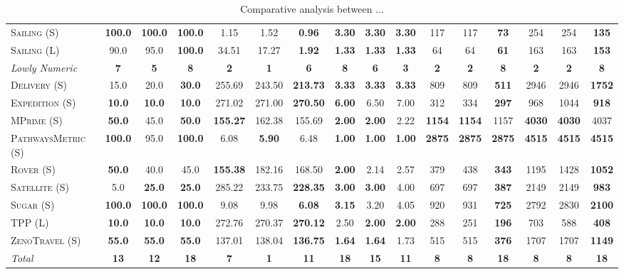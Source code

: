 \documentclass[11pt,landscape]{article}
\begin{document}
\begin{table*}[tb]
{\begin{tabular}{|l||ccc||ccc||ccc||ccc||ccc||}
\textsc{Sailing} (S)&\textbf{100.0}&\textbf{100.0}&\textbf{100.0}&1.15&1.52&\textbf{0.96}&\textbf{3.30}&\textbf{3.30}&\textbf{3.30}&117&117&\textbf{73}&254&254&\textbf{135}\\
\textsc{Sailing} (L)&90.0&95.0&\textbf{100.0}&34.51&17.27&\textbf{1.92}&\textbf{1.33}&\textbf{1.33}&\textbf{1.33}&64&64&\textbf{61}&163&163&\textbf{153}
\\\hline
\textit{Lowly Numeric}&\textbf{7}&\textbf{5}&\textbf{8}&\textbf{2}&\textbf{1}&\textbf{6}&\textbf{8}&\textbf{6}&\textbf{3}&\textbf{2}&\textbf{2}&\textbf{8}&\textbf{2}&\textbf{2}&\textbf{8}\\\hline
\textsc{Delivery} (S)&15.0&20.0&\textbf{30.0}&255.69&243.50&\textbf{213.73}&\textbf{3.33}&\textbf{3.33}&\textbf{3.33}&809&809&\textbf{511}&2946&2946&\textbf{1752}\\
\textsc{Expedition} (S)&\textbf{10.0}&\textbf{10.0}&\textbf{10.0}&271.02&271.00&\textbf{270.50}&\textbf{6.00}&6.50&7.00&312&334&\textbf{297}&968&1044&\textbf{918}\\
\textsc{MPrime} (S)&\textbf{50.0}&45.0&\textbf{50.0}&\textbf{155.27}&162.38&155.69&\textbf{2.00}&\textbf{2.00}&2.22&\textbf{1154}&\textbf{1154}&1157&\textbf{4030}&\textbf{4030}&4037\\
\textsc{PathwaysMetric} (S)&\textbf{100.0}&95.0&\textbf{100.0}&6.08&\textbf{5.90}&6.48&\textbf{1.00}&\textbf{1.00}&\textbf{1.00}&\textbf{2875}&\textbf{2875}&\textbf{2875}&\textbf{4515}&\textbf{4515}&\textbf{4515}\\
\textsc{Rover} (S)&\textbf{50.0}&40.0&45.0&\textbf{155.38}&182.16&168.50&\textbf{2.00}&2.14&2.57&379&438&\textbf{343}&1195&1428&\textbf{1052}\\
\textsc{Satellite} (S)&5.0&\textbf{25.0}&\textbf{25.0}&285.22&233.75&\textbf{228.35}&\textbf{3.00}&\textbf{3.00}&4.00&697&697&\textbf{387}&2149&2149&\textbf{983}\\
\textsc{Sugar} (S)&\textbf{100.0}&\textbf{100.0}&\textbf{100.0}&9.08&9.98&\textbf{6.08}&\textbf{3.15}&3.20&4.05&920&931&\textbf{725}&2792&2830&\textbf{2100}\\
\textsc{TPP} (L)&\textbf{10.0}&\textbf{10.0}&\textbf{10.0}&272.76&270.37&\textbf{270.12}&2.50&\textbf{2.00}&\textbf{2.00}&288&251&\textbf{196}&703&588&\textbf{408}\\
\textsc{ZenoTravel} (S)&\textbf{55.0}&\textbf{55.0}&\textbf{55.0}&137.01&138.04&\textbf{136.75}&\textbf{1.64}&\textbf{1.64}&1.73&515&515&\textbf{376}&1707&1707&\textbf{1149}
\\\hline
\textit{Total}&\textbf{13}&\textbf{12}&\textbf{18}&\textbf{7}&\textbf{1}&\textbf{11}&\textbf{18}&\textbf{15}&\textbf{11}&\textbf{8}&\textbf{8}&\textbf{18}&\textbf{8}&\textbf{8}&\textbf{18}\\\hline

        \end{tabular}}
        \caption{Comparative analysis between ...}
        \label{tab:experiments}
        \end{table*}
        
\end{document}
